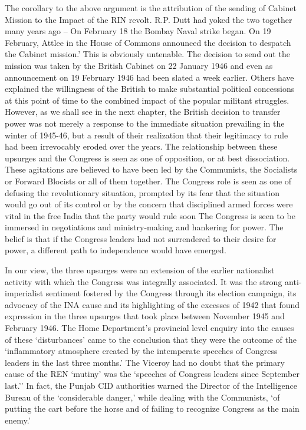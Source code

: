 The corollary to the above argument is the attribution of the sending of Cabinet Mission to the Impact of the RIN revolt. R.P. Dutt had yoked the two together many years ago – On February 18 the Bombay Naval strike began. On 19 February, Attlee in the House of Commons announced the decision to despatch the Cabinet mission.' This is obviously untenable. The decision to send out the mission was taken by the British Cabinet on 22 January 1946 and even as announcement on 19 February 1946 had been slated a week earlier. Others have explained the willingness of the British to make substantial political concessions at this point of time to the combined impact of the popular militant struggles. However, as we shall see in the next chapter, the British decision to transfer power was not merely a response to the immediate situation prevailing in the winter of 1945-46, but a result of their realization that their legitimacy to rule had been irrevocably eroded over the years. The relationship between these upsurges and the Congress is seen as one of opposition, or at best dissociation. These agitations are believed to have been led by the Communists, the Socialists or Forward Blocists or all of them together. The Congress role is seen as one of defusing the revolutionary situation, prompted by its fear that the situation would go out of its control or by the concern that disciplined armed forces were vital in the free India that the party would rule soon The Congress is seen to be immersed in negotiations and ministry-making and hankering for power. The belief is that if the Congress leaders had not surrendered to their desire for power, a different path to independence would have emerged. 

In our view, the three upsurges were an extension of the earlier nationalist activity with which the Congress was integrally associated. It was the strong anti-imperialist sentiment fostered by the Congress through its election campaign, its advocacy of the INA cause and its highlighting of the excesses of 1942 that found expression in the three upsurges that took place between November 1945 and February 1946. The Home Department's provincial level enquiry into the causes of these `disturbances' came to the conclusion that they were the outcome of the `inflammatory atmosphere created by the intemperate speeches of Congress leaders in the last three months.' The Viceroy had no doubt that the primary cause of the REN `mutiny' was the `speeches of Congress leaders since September last.'' In fact, the Punjab CID authorities warned the Director of the Intelligence Bureau of the `considerable danger,' while dealing with the Communists, `of putting the cart before the horse and of failing to recognize Congress as the main enemy.' 


